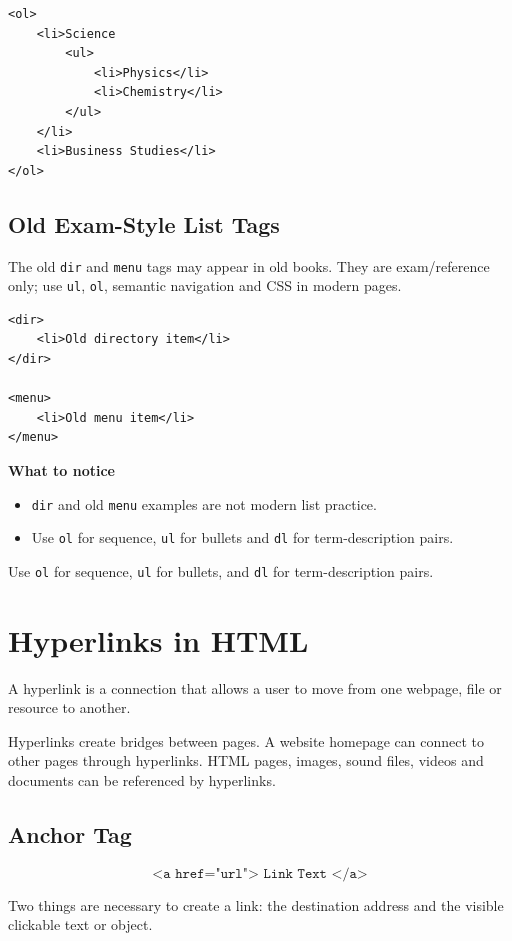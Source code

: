 \begin{lstlisting}[style=htmlide, caption={Nested List}]
<ol>
    <li>Science
        <ul>
            <li>Physics</li>
            <li>Chemistry</li>
        </ul>
    </li>
    <li>Business Studies</li>
</ol>
\end{lstlisting}

\subsection{Old Exam-Style List Tags}
The old \texttt{dir} and \texttt{menu} tags may appear in old books. They are exam/reference only; use \texttt{ul}, \texttt{ol}, semantic navigation and CSS in modern pages.

\begin{lstlisting}[style=htmlide, caption={Old List Tags}]
<dir>
    <li>Old directory item</li>
</dir>

<menu>
    <li>Old menu item</li>
</menu>
\end{lstlisting}

\textbf{What to notice}
\begin{itemize}
    \item \texttt{dir} and old \texttt{menu} examples are not modern list practice.
    \item Use \texttt{ol} for sequence, \texttt{ul} for bullets and \texttt{dl} for term-description pairs.
\end{itemize}

\begin{summarybox}
Use \texttt{ol} for sequence, \texttt{ul} for bullets, and \texttt{dl} for term-description pairs.
\end{summarybox}

\section{Hyperlinks in HTML}

\begin{definitionbox}[Hyperlink]
A hyperlink is a connection that allows a user to move from one webpage, file or resource to another.
\end{definitionbox}

Hyperlinks create bridges between pages. A website homepage can connect to other pages through hyperlinks. HTML pages, images, sound files, videos and documents can be referenced by hyperlinks.

\subsection{Anchor Tag}
\begin{formulabox}
\[
\texttt{<a href="url"> Link Text </a>}
\]
\end{formulabox}
Two things are necessary to create a link: the destination address and the visible clickable text or object.

